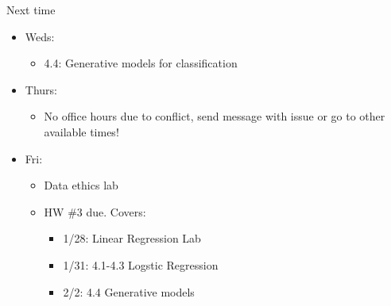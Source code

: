 \documentclass[aspectratio=169,usenames,dvipsnames]{beamer}
\begin{document}
\begin{frame}[t]{Next time}

	\begin{itemize}
		\item Weds:
		\begin{itemize}
			\item 4.4: Generative models for classification
		\end{itemize}
		\item Thurs:
		\begin{itemize}
			\item No office hours due to conflict, send message with issue or go to other available times!
		\end{itemize}

		\item Fri:
		\begin{itemize}
			\item Data ethics lab
			\item HW \#3 due. Covers:
			\begin{itemize}
				\item 1/28: Linear Regression Lab
				\item 1/31: 4.1-4.3 Logstic Regression
				\item 2/2: 4.4 Generative models
			\end{itemize}
		\end{itemize}


	\end{itemize}
\end{frame}
\end{document}
